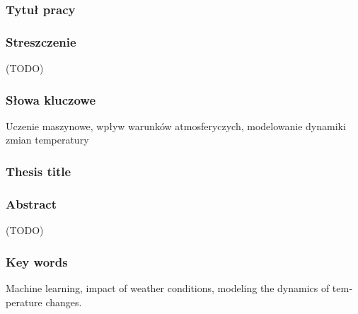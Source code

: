 \documentclass[a4paper,twoside,12pt]{book}
\begin{document}


\cleardoublepage

\rmfamily\normalfont
\pagestyle{empty}



\subsubsection*{Tytuł pracy}
\Title

\subsubsection*{Streszczenie}
(TODO)

\subsubsection*{Słowa kluczowe}
Uczenie maszynowe, wpływ warunków atmosferyczych, modelowanie dynamiki zmian temperatury

\subsubsection*{Thesis title}
\begin{otherlanguage}{british}
  \TitleAlt
\end{otherlanguage}

\subsubsection*{Abstract}
\begin{otherlanguage}{british}
  (TODO)
\end{otherlanguage}
\subsubsection*{Key words}
\begin{otherlanguage}{british}
  Machine learning, impact of weather conditions, modeling the dynamics of temperature changes.
\end{otherlanguage}




\tableofcontents
\end{document}
